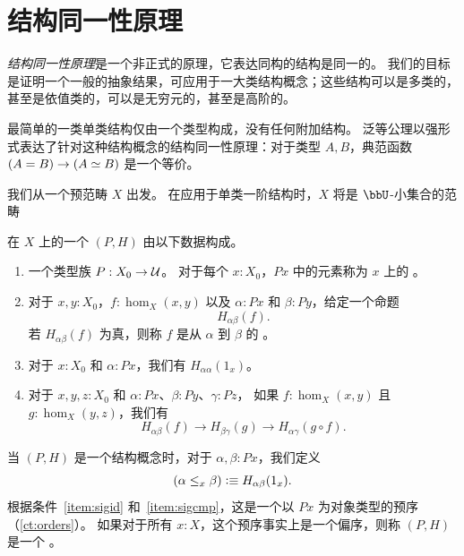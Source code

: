 \section{结构同一性原理}
\label{sec:sip}

\emph{结构同一性原理}是一个非正式的原理，它表达同构的结构是同一的。
我们的目标是证明一个一般的抽象结果，可应用于一大类结构概念；这些结构可以是多类的，甚至是依值类的，可以是无穷元的，甚至是高阶的。

最简单的一类单类结构仅由一个类型构成，没有任何附加结构。
泛等公理以强形式表达了针对这种结构概念的结构同一性原理：对于类型 $A,B$，典范函数 $(A=B)\to (A \simeq B)$ 是一个等价。

我们从一个预范畴 $X$ 出发。
在应用于单类一阶结构时，$X$ 将是 $\bbU$-小集合的范畴 %

\begin{defn}\label{ct:sig}
  在 $X$ 上的一个
  $(P,H)$ 由以下数据构成。
  \begin{enumerate}
  \item 一个类型族 $P:X_0 \to \mathcal{U}$。
    对于每个 $x:X_0$，$Px$ 中的元素称为 $x$ 上的
    。
  \item 对于 $x,y:X_0$，$f:\hom_X(x,y)$ 以及 $\alpha:Px$ 和 $\beta:Py$，给定一个命题
  \[ H_{\alpha\beta}(f).\]
    若 $H_{\alpha\beta}(f)$ 为真，则称 $f$ 是从 $\alpha$ 到 $\beta$ 的
    。
  \item 对于 $x:X_0$ 和 $\alpha:Px$，我们有 $H_{\alpha\alpha}(1_x)$。\label{item:sigid}
  \item 对于 $x,y,z:X_0$ 和 $\alpha:Px$、$\beta:Py$、$\gamma:Pz$，
如果 $f:\hom_X(x,y)$ 且 $g:\hom_X(y,z)$，我们有\label{item:sigcmp}
  \[ H_{\alpha\beta}(f)\to H_{\beta\gamma}(g)\to H_{\alpha\gamma}(g\circ   f).\]
   \end{enumerate}
  当 $(P,H)$ 是一个结构概念时，对于 $\alpha,\beta:Px$，我们定义
  \[ (\alpha\leq_x\beta) \vcentcolon\equiv H_{\alpha\beta}(1_x).\]
  根据条件~\ref{item:sigid} 和~\ref{item:sigcmp}，这是一个以 $Px$ 为对象类型的预序（\cref{ct:orders}）。
  如果对于所有 $x:X$，这个预序事实上是一个偏序，则称 $(P,H)$ 是一个
  。
\end{defn}

